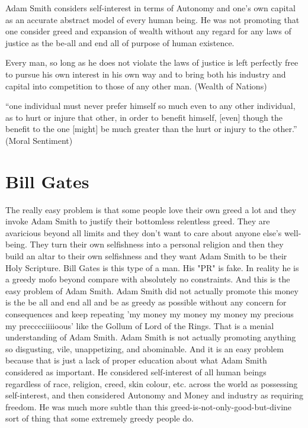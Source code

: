 \documentclass{amsart}
\begin{document}
Adam Smith considers self-interest in terms of Autonomy and one's own capital as an accurate abstract model of every human being.  He was not promoting that one consider greed and expansion of wealth without any regard for any laws of justice as the be-all and end all of purpose of human existence.

Every man, so long as he does not violate the laws of justice is left perfectly free to pursue his own interest in his own way and to bring both his industry and capital into competition to those of any other man. (Wealth of Nations)

“one individual must never prefer himself so much even to any other individual, as to hurt or injure that other, in order to benefit himself, [even] though the benefit to the one [might] be much greater than the hurt or injury to the other.” (Moral Sentiment)

\section{Bill Gates}

The really easy problem is that some people love their own greed a lot and they invoke Adam Smith to justify their bottomless relentless greed.  They are avaricious beyond all limits and they don't want to care about anyone else's well-being.  They turn their own selfishness into a personal religion and then they build an altar to their own selfishness and they want Adam Smith to be their Holy Scripture.  Bill Gates is this type of a man.  His "PR" is fake.  In reality he is a greedy mofo beyond compare with absolutely no constraints.  And this is the easy problem of Adam Smith.  Adam Smith did not actually promote this money is the be all and end all and be as greedy as possible without any concern for consequences and keep repeating 'my money my money my money my precious my precccciiiioous' like the Gollum of Lord of the Rings.  That is a menial understanding of Adam Smith.  Adam Smith is not actually promoting anything so disgusting, vile, unappetizing, and abominable.  And it is an easy problem because that is just a lack of proper education about what Adam Smith considered as important.  He considered self-interest of all human beings regardless of race, religion, creed, skin colour, etc. across the world as possessing self-interest, and then considered Autonomy and Money and industry as requiring freedom.  He was much more subtle than this greed-is-not-only-good-but-divine sort of thing that some extremely greedy people do.  
\end{document}

